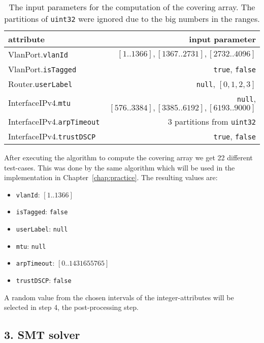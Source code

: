 \begin{table}[h]
\centering
\begin{tabular}{l|r}
 \textbf{attribute} & \textbf{input parameter}\\ \hline
 \textsf{VlanPort.}\verb|vlanId| & $[1..1366],[1367..2731],[2732..4096]$ \\ \hline
 \textsf{VlanPort.}\verb|isTagged| & \verb|true|, \verb|false| \\ \hline
 \textsf{Router.}\verb|userLabel| & \verb|null|, $[0,1,2,3]$ \\ \hline
 \textsf{InterfaceIPv4.}\verb|mtu| & \verb|null|, $[576..3384],[3385..6192],[6193..9000]$ \\ \hline
 \textsf{InterfaceIPv4.}\verb|arpTimeout| & 3 partitions from \verb|uint32| \\ \hline
 \textsf{InterfaceIPv4.}\verb|trustDSCP| & \verb|true|, \verb|false| 
\end{tabular}
 \caption[Input parameter for covering array computation.]{The input parameters for the computation of the covering array. The partitions of \texttt{uint32} were ignored due to the big numbers in the ranges.}\label{tab:exAllPairs}
\end{table}
After executing the algorithm to compute the covering array we get 22 different test-cases. This was done by the same algorithm which will be used in the implementation in Chapter~\ref{chap:practice}. The resulting values are:
\begin{itemize}
 \item \verb|vlanId|: $[1..1366]$
 \item \verb|isTagged|: \verb|false|
 \item \verb|userLabel|: \verb|null|
 \item \verb|mtu|: \verb|null|
 \item \verb|arpTimeout|: $[0..1431655765]$
 \item \verb|trustDSCP|: \verb|false|
\end{itemize}
A random value from the chosen intervals of the integer-attributes will be selected in step 4, the post-processing step.

\subsection*{3. SMT solver}

